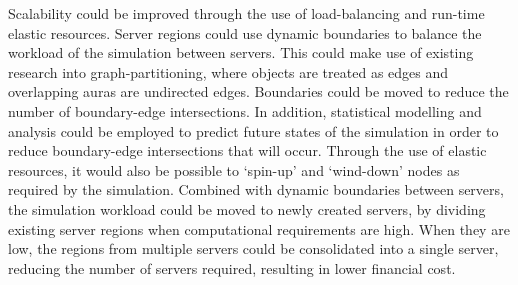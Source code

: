 

Scalability could be improved through the use of load-balancing and run-time elastic resources. Server regions could use dynamic boundaries to balance the workload of the simulation between servers. This could make use of existing research into graph-partitioning, where objects are treated as edges and overlapping auras are undirected edges. Boundaries could be moved to reduce the number of boundary-edge intersections. In addition, statistical modelling and analysis could be employed to predict future states of the simulation in order to reduce boundary-edge intersections that will occur. Through the use of elastic resources, it would also be possible to `spin-up' and `wind-down' nodes as required by the simulation. Combined with dynamic boundaries between servers, the simulation workload could be moved to newly created servers, by dividing existing server regions when computational requirements are high. When they are low, the regions from multiple servers could be consolidated into a single server, reducing the number of servers required, resulting in lower financial cost.



